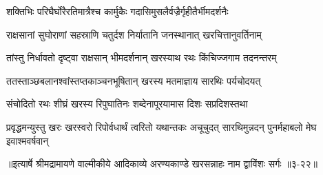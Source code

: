 \twolineshloka
{शक्तिभिः परिघैर्घोरैरतिमात्रैश्च कार्मुकैः}
{गदासिमुसलैर्वज्रैर्गृहीतैर्भीमदर्शनैः} %

\twolineshloka
{राक्षसानां सुघोराणां सहस्राणि चतुर्दश}
{निर्यातानि जनस्थानात् खरचित्तानुवर्तिनाम्} %

\twolineshloka
{तांस्तु निर्धावतो दृष्ट्वा राक्षसान् भीमदर्शनान्}
{खरस्याथ रथः किंचिज्जगाम तदनन्तरम्} %

\twolineshloka
{ततस्ताञ्छबलानश्वांस्तप्तकाञ्चनभूषितान्}
{खरस्य मतमाज्ञाय सारथिः पर्यचोदयत्} %

\twolineshloka
{संचोदितो रथः शीघ्रं खरस्य रिपुघातिनः}
{शब्देनापूरयामास दिशः सप्रदिशस्तथा} %

\twolineshloka
{प्रवृद्धमन्युस्तु खरः खरस्वरो रिपोर्वधार्थं त्वरितो यथान्तकः}
{अचूचुदत् सारथिमुन्नदन् पुनर्महाबलो मेघ इवाश्मवर्षवान्} %


॥इत्यार्षे श्रीमद्रामायणे वाल्मीकीये आदिकाव्ये अरण्यकाण्डे खरसन्नाहः नाम द्वाविंशः सर्गः ॥३-२२॥
